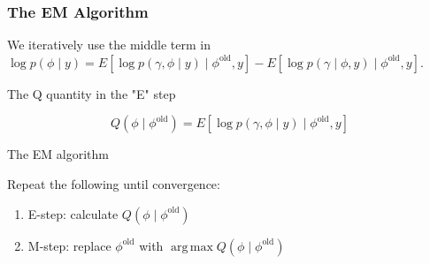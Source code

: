 \documentclass{beamer}
\DeclareMathOperator*{\argmax}{arg\,max}
\begin{document}
\begin{frame}[fragile]
\frametitle{The EM Algorithm}

We iteratively use the middle term in
$\log p(\phi \mid y) =  E\left[ \log p(\gamma, \phi \mid y) \mid \phi^{\text{old}}, y \right] - E\left[\log p(\gamma \mid \phi, y) \mid \phi^{\text{old}}, y \right]$.

\begin{block}{The Q quantity in the "E" step}

$$
Q(\phi \mid \phi^{\text{old}}) = E\left[ \log p(\gamma, \phi \mid y) \mid \phi^{\text{old}}, y \right]
$$
\end{block}
\pause

\begin{block}{The EM algorithm}

Repeat the following until convergence:
\begin{enumerate}
\item E-step: calculate $Q(\phi \mid \phi^{\text{old}})$
\item M-step: replace $\phi^{\text{old}}$ with $\argmax Q(\phi \mid \phi^{\text{old}})$
\end{enumerate}
\end{block}
\end{frame}
\end{document}
